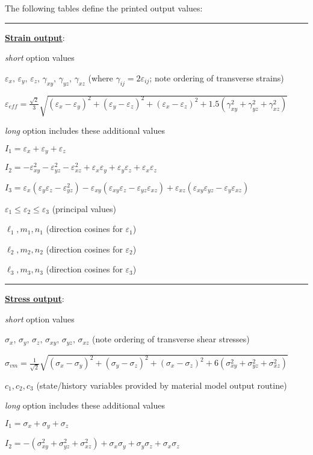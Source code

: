 \documentclass[11pt]{report}
\numberwithin{equation}{section}
\newcommand{\nin} {\noindent}
\newcommand{\ul} {\underline}
\newcommand{\ti}{\emph}
\newcommand{\veps}{\varepsilon}
\begin{document}
\nin The following tables define the printed output values:
\small
\vspace{0.1in}
\hrule
\nin \ul{\bf{Strain output}}:

\nin \ti{short} option values

\nin $\veps_{x},\, \veps_{y},\, \veps_{z},\, \gamma_{xy},\, \gamma_{yz},\, \gamma_{xz}$  
 (where $\gamma_{ij} = 2\veps_{ij}$; note ordering of transverse strains)

\nin $\veps_{eff} =\frac{\sqrt{2}}{3} \sqrt{ (\veps_x - \veps_y)^2+(\veps_y - \veps_z)^2 +(\veps_x - \veps_z)^2
+ 1.5 ( \gamma_{xy}^2 +  \gamma_{yz}^2 + \gamma_{xz}^2)}$

\nin \ti{long} option includes these additional values

\nin $I_1 = \veps_x + \veps_y + \veps_z$ 

\nin $I_2 = -\veps_{xy}^2-\veps_{yz}^2-\veps_{xz}^2 + \veps_x\veps_y+
 \veps_y\veps_z+ \veps_x\veps_z$
 
 \nin $I_3 = \veps_x \left ( \veps_y\veps_z - \veps_{yz}^2 \right ) - 
       \veps_{xy} \left ( \veps_{xy}\veps_z - \veps_{yz}\veps_{xz} \right ) +
       \veps_{xz} \left ( \veps_{xy}\veps_{yz} - \veps_y\veps_{xz} \right ) $ 
       
\nin $\veps_1 \le \veps_2 \le \veps_3$ (principal values)

\nin $\ell_1, m_1, n_1$  (direction cosines for $\veps_1$)

\nin $\ell_2, m_2, n_2$ (direction cosines for $\veps_2$)

\nin $\ell_3, m_3, n_3$ (direction cosines for $\veps_3$)

\vspace{0.1in}
\hrule
\nin \ul{\bf{Stress output}}:

\nin \ti{short} option values

\nin $\sigma_{x},\, \sigma_{y},\, \sigma_{z},\, \sigma_{xy},\, \sigma_{yz},\, \sigma_{xz}$  
 (note ordering of transverse shear stresses)

\nin $\sigma_{vm} =\frac{1}{\sqrt{2}} \sqrt{ (\sigma_x - \sigma_y)^2+(\sigma_y - \sigma_z)^2 +(\sigma_x - \sigma_z)^2
+ 6 ( \sigma_{xy}^2 +  \sigma_{yz}^2 + \sigma_{xz}^2)}$

\nin $c_1, c_2, c_3$ (state/history variables provided by material model output routine)

\nin \ti{long} option includes these additional values

\nin $I_1 = \sigma_x + \sigma_y + \sigma_z$ 

\nin $I_2 = - ( \sigma_{xy}^2+\sigma_{yz}^2+\sigma_{xz}^2 )+ \sigma_x\sigma_y+
 \sigma_y\sigma_z+ \sigma_x\sigma_z$
 
\end{document}

